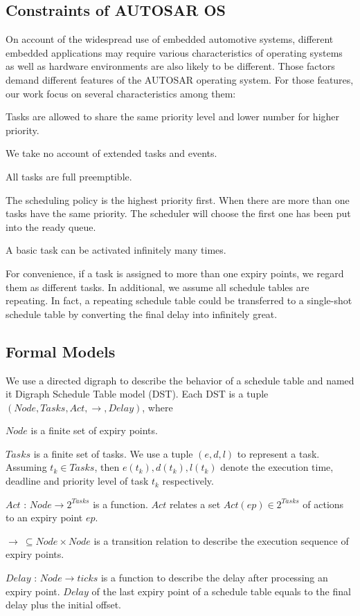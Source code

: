 \documentclass[sigconf]{acmart}
\begin{document}
\subsection{Constraints of AUTOSAR OS}
On account of the widespread use of embedded automotive systems, different embedded applications may require various characteristics of operating systems as well as hardware environments are also likely to be different. Those factors demand different features of the AUTOSAR operating system. For those features, our work focus on several characteristics among them: 
\begin{compactenum}
  \item Tasks are allowed to share the same priority level and lower number for higher priority.
  \item We take no account of extended tasks and events.
  \item All tasks are full preemptible.
  \item The scheduling policy is the highest priority first. When there are more than one tasks have the same priority. The scheduler will choose the first one has been put into the ready queue.
  \item A basic task can be activated infinitely many times. 
\end{compactenum}

For convenience, if a task is assigned to more than one expiry points, we regard them as different tasks. In additional, we assume all schedule tables are repeating. In fact, a repeating schedule table could be transferred to a single-shot schedule table by converting the final delay into infinitely great.

\subsection{Formal Models}
We use a directed digraph to describe the behavior of a schedule table and named it Digraph Schedule Table model (DST). Each DST is a tuple $(Node,Tasks,Act,\rightarrow,Delay)$, where
\begin{compactitem}
  \item $Node$ is a finite set of expiry points.
  \item $Tasks$ is a finite set of tasks. We use a tuple $(e,d,l)$ to represent a task. Assuming $t_k\in Tasks$, then $e(t_k),d(t_k),l(t_k)$ denote the execution time, deadline and priority level of task $t_k$ respectively.%
  \item $Act$ : $Node \rightarrow 2^{Tasks}$ is a function. $Act$ relates a set $Act(ep)\in 2^{Tasks}$ of actions to an expiry point $ep$.
  \item $\rightarrow\ \subseteq Node\times Node$ is a transition relation to describe the execution sequence of expiry points. 
  \item $Delay$ : $Node \rightarrow ticks$ is a function to describe the delay after processing an expiry point. $Delay$ of the last expiry point of a schedule table equals to the final delay plus the initial offset.
\end{compactitem}
\end{document}
